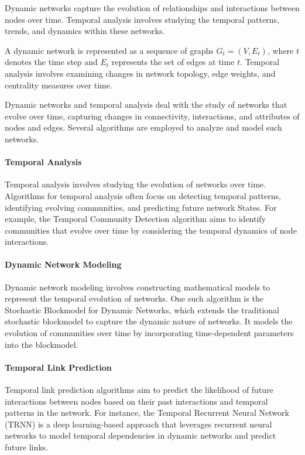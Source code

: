 \documentclass[12pt]{book} %
\begin{document}
Dynamic networks capture the evolution of relationships and interactions between nodes over time. Temporal analysis involves studying the temporal patterns, trends, and dynamics within these networks.

A dynamic network is represented as a sequence of graphs \(G_t = (V, E_t)\), where \(t\) denotes the time step and \(E_t\) represents the set of edges at time \(t\). Temporal analysis involves examining changes in network topology, edge weights, and centrality measures over time.

Dynamic networks and temporal analysis deal with the study of networks that evolve over time, capturing changes in connectivity, interactions, and attributes of nodes and edges. Several algorithms are employed to analyze and model such networks.

\paragraph{Temporal Analysis}

Temporal analysis involves studying the evolution of networks over time. Algorithms for temporal analysis often focus on detecting temporal patterns, identifying evolving communities, and predicting future network States. For example, the Temporal Community Detection algorithm aims to identify communities that evolve over time by considering the temporal dynamics of node interactions.

\paragraph{Dynamic Network Modeling}

Dynamic network modeling involves constructing mathematical models to represent the temporal evolution of networks. One such algorithm is the Stochastic Blockmodel for Dynamic Networks, which extends the traditional stochastic blockmodel to capture the dynamic nature of networks. It models the evolution of communities over time by incorporating time-dependent parameters into the blockmodel.

\paragraph{Temporal Link Prediction}

Temporal link prediction algorithms aim to predict the likelihood of future interactions between nodes based on their past interactions and temporal patterns in the network. For instance, the Temporal Recurrent Neural Network (TRNN) is a deep learning-based approach that leverages recurrent neural networks to model temporal dependencies in dynamic networks and predict future links.
\end{document}
